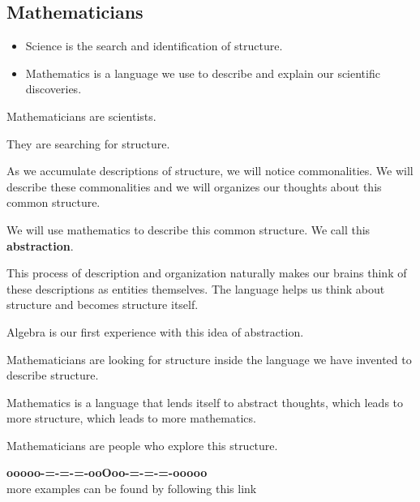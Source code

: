 \documentclass{ximera}
\begin{document}
\subsection*{Mathematicians}


\begin{itemize}
\item Science is the search and identification of structure.
\item Mathematics is a language we use to describe and explain our scientific discoveries.
\end{itemize}


Mathematicians are scientists.

They are searching for structure.


As we accumulate descriptions of structure, we will notice commonalities. We will describe these commonalities and we will organizes our thoughts about this common structure. 

We will use mathematics to describe this common structure. We call this \textbf{\textcolor{blue!55!black}{abstraction}}.

This process of description and organization naturally makes our brains think of these descriptions as entities themselves. The language helps us think about structure and becomes structure itself.

Algebra is our first experience with this idea of abstraction.

Mathematicians are looking for structure inside the language we have invented to describe structure.

Mathematics is a language that lends itself to abstract thoughts, which leads to more structure, which leads to more mathematics.

Mathematicians are people who explore this structure.






























\begin{onlineOnly}
\begin{center}
\textbf{\textcolor{green!50!black}{ooooo-=-=-=-ooOoo-=-=-=-ooooo}} \\

more examples can be found by following this link\\ 

\end{center}
\end{onlineOnly}
\end{document}

